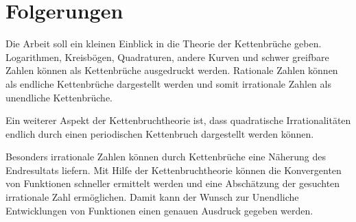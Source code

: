 %
%
%
\section{Folgerungen
\label{kettenbruch:section:folgerungen}}
Die Arbeit soll ein kleinen Einblick in die Theorie der Kettenbrüche geben.
Logarithmen, Kreisbögen, Quadraturen, andere Kurven und schwer greifbare Zahlen können als Kettenbrüche ausgedruckt werden. Rationale Zahlen können als endliche Kettenbrüche dargestellt werden und somit irrationale Zahlen als unendliche Kettenbrüche.

Ein weiterer Aspekt der Kettenbruchtheorie ist, dass quadratische Irrationalitäten endlich durch einen periodischen Kettenbruch dargestellt werden können.

Besonders irrationale Zahlen können durch Kettenbrüche eine Näherung des Endresultats liefern. Mit Hilfe der Kettenbruchtheorie können die Konvergenten von Funktionen schneller ermittelt werden und eine Abschätzung der gesuchten irrationale Zahl ermöglichen. Damit kann der Wunsch zur Unendliche Entwicklungen von Funktionen einen genauen Ausdruck gegeben werden.